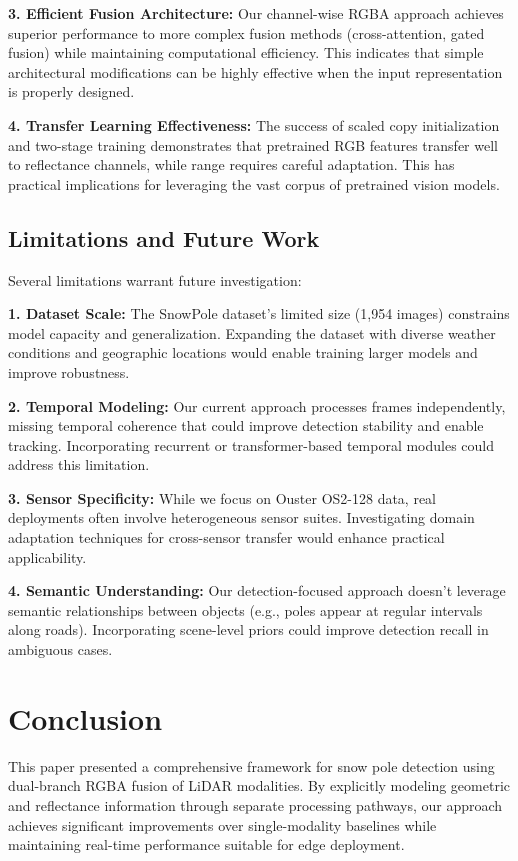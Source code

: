 \textbf{3. Efficient Fusion Architecture:} Our channel-wise RGBA approach achieves superior performance to more complex fusion methods (cross-attention, gated fusion) while maintaining computational efficiency. This indicates that simple architectural modifications can be highly effective when the input representation is properly designed.

\textbf{4. Transfer Learning Effectiveness:} The success of scaled copy initialization and two-stage training demonstrates that pretrained RGB features transfer well to reflectance channels, while range requires careful adaptation. This has practical implications for leveraging the vast corpus of pretrained vision models.

\subsection{Limitations and Future Work}

Several limitations warrant future investigation:

\textbf{1. Dataset Scale:} The SnowPole dataset's limited size (1,954 images) constrains model capacity and generalization. Expanding the dataset with diverse weather conditions and geographic locations would enable training larger models and improve robustness.

\textbf{2. Temporal Modeling:} Our current approach processes frames independently, missing temporal coherence that could improve detection stability and enable tracking. Incorporating recurrent or transformer-based temporal modules could address this limitation.

\textbf{3. Sensor Specificity:} While we focus on Ouster OS2-128 data, real deployments often involve heterogeneous sensor suites. Investigating domain adaptation techniques for cross-sensor transfer would enhance practical applicability.

\textbf{4. Semantic Understanding:} Our detection-focused approach doesn't leverage semantic relationships between objects (e.g., poles appear at regular intervals along roads). Incorporating scene-level priors could improve detection recall in ambiguous cases.

\section{Conclusion}

This paper presented a comprehensive framework for snow pole detection using dual-branch RGBA fusion of LiDAR modalities. By explicitly modeling geometric and reflectance information through separate processing pathways, our approach achieves significant improvements over single-modality baselines while maintaining real-time performance suitable for edge deployment.

